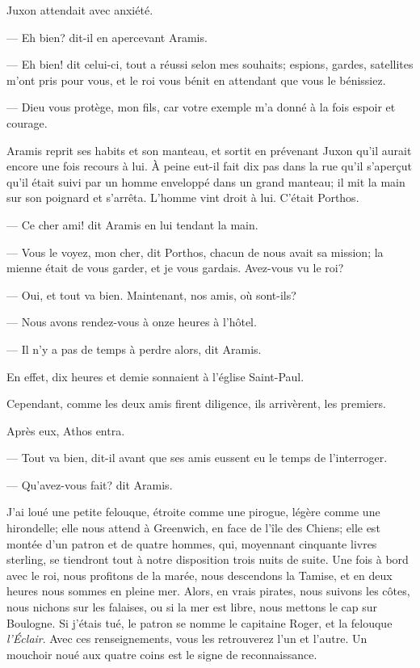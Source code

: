 Juxon attendait avec anxiété.

— Eh bien? dit-il en apercevant Aramis.

— Eh bien! dit celui-ci, tout a réussi selon mes souhaits; espions, gardes, satellites m'ont pris pour vous, et le roi vous bénit en attendant que vous le bénissiez.

— Dieu vous protège, mon fils, car votre exemple m'a donné à la fois espoir et courage.

Aramis reprit ses habits et son manteau, et sortit en prévenant Juxon qu'il aurait encore une fois recours à lui.
À peine eut-il fait dix pas dans la rue qu'il s'aperçut qu'il était suivi par un homme enveloppé dans un grand manteau; il mit la main sur son poignard et s'arrêta. L'homme vint droit à lui. C'était Porthos.

— Ce cher ami! dit Aramis en lui tendant la main.

— Vous le voyez, mon cher, dit Porthos, chacun de nous avait sa mission; la mienne était de vous garder, et je vous gardais. Avez-vous vu le roi?

— Oui, et tout va bien. Maintenant, nos amis, où sont-ils?

— Nous avons rendez-vous à onze heures à l'hôtel.

— Il n'y a pas de temps à perdre alors, dit Aramis.

En effet, dix heures et demie sonnaient à l'église Saint-Paul.

Cependant, comme les deux amis firent diligence, ils arrivèrent, les premiers.

Après eux, Athos entra.

— Tout va bien, dit-il avant que ses amis eussent eu le temps de l'interroger.

— Qu'avez-vous fait? dit Aramis.

J'ai loué une petite felouque, étroite comme une pirogue, légère comme une hirondelle; elle nous attend à Greenwich, en face de l'île des Chiens; elle est montée d'un patron et de quatre hommes, qui, moyennant cinquante livres sterling, se tiendront tout à notre disposition trois nuits de suite. Une fois à bord avec le roi, nous profitons de la marée, nous descendons la Tamise, et en deux heures nous sommes en pleine mer. Alors, en vrais pirates, nous suivons les côtes, nous nichons sur les falaises, ou si la mer est libre, nous mettons le cap sur Boulogne. Si j'étais tué, le patron se nomme le capitaine Roger, et la felouque \textit{l'Éclair}. Avec ces renseignements, vous les retrouverez l'un et l'autre. Un mouchoir noué aux quatre coins est le signe de reconnaissance.

